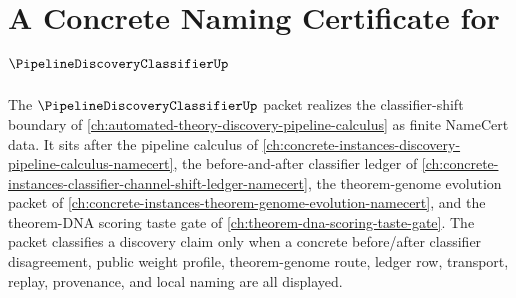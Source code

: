 \chapter{A Concrete Naming Certificate for $\PipelineDiscoveryClassifierUp$}
\label{ch:concrete-instances-pipeline-discovery-classifier-namecert}

The $\PipelineDiscoveryClassifierUp$ packet realizes the classifier-shift boundary of \autoref{ch:automated-theory-discovery-pipeline-calculus} as finite NameCert data. It sits after the pipeline calculus of \autoref{ch:concrete-instances-discovery-pipeline-calculus-namecert}, the before-and-after classifier ledger of \autoref{ch:concrete-instances-classifier-channel-shift-ledger-namecert}, the theorem-genome evolution packet of \autoref{ch:concrete-instances-theorem-genome-evolution-namecert}, and the theorem-DNA scoring taste gate of \autoref{ch:theorem-dna-scoring-taste-gate}. The packet classifies a discovery claim only when a concrete before/after classifier disagreement, public weight profile, theorem-genome route, ledger row, transport, replay, provenance, and local naming are all displayed.

